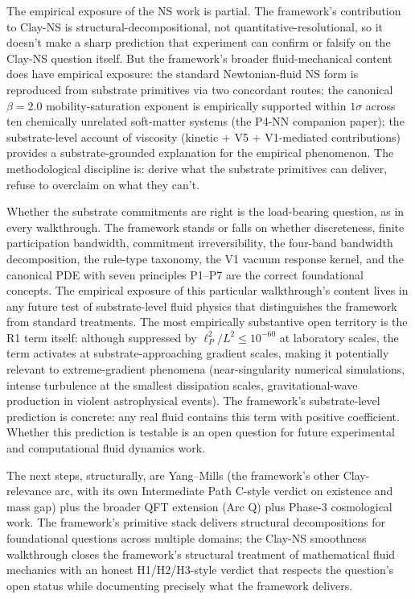 \documentclass[11pt,a4paper]{article}
\begin{document}
The empirical exposure of the NS work is partial. The framework's contribution to Clay-NS is structural-decompositional, not quantitative-resolutional, so it doesn't make a sharp prediction that experiment can confirm or falsify on the Clay-NS question itself. But the framework's broader fluid-mechanical content does have empirical exposure: the standard Newtonian-fluid NS form is reproduced from substrate primitives via two concordant routes; the canonical $\beta = 2.0$ mobility-saturation exponent is empirically supported within $1\sigma$ across ten chemically unrelated soft-matter systems (the P4-NN companion paper); the substrate-level account of viscosity (kinetic + V5 + V1-mediated contributions) provides a substrate-grounded explanation for the empirical phenomenon. The methodological discipline is: derive what the substrate primitives can deliver, refuse to overclaim on what they can't.

Whether the substrate commitments are right is the load-bearing question, as in every walkthrough. The framework stands or falls on whether discreteness, finite participation bandwidth, commitment irreversibility, the four-band bandwidth decomposition, the rule-type taxonomy, the V1 vacuum response kernel, and the canonical PDE with seven principles P1--P7 are the correct foundational concepts. The empirical exposure of this particular walkthrough's content lives in any future test of substrate-level fluid physics that distinguishes the framework from standard treatments. The most empirically substantive open territory is the R1 term itself: although suppressed by $\ell_P^2 / L^2 \leq 10^{-60}$ at laboratory scales, the term activates at substrate-approaching gradient scales, making it potentially relevant to extreme-gradient phenomena (near-singularity numerical simulations, intense turbulence at the smallest dissipation scales, gravitational-wave production in violent astrophysical events). The framework's substrate-level prediction is concrete: any real fluid contains this term with positive coefficient. Whether this prediction is testable is an open question for future experimental and computational fluid dynamics work.

The next steps, structurally, are Yang--Mills (the framework's other Clay-relevance arc, with its own Intermediate Path C-style verdict on existence and mass gap) plus the broader QFT extension (Arc Q) plus Phase-3 cosmological work. The framework's primitive stack delivers structural decompositions for foundational questions across multiple domains; the Clay-NS smoothness walkthrough closes the framework's structural treatment of mathematical fluid mechanics with an honest H1/H2/H3-style verdict that respects the question's open status while documenting precisely what the framework delivers.
\end{document}
